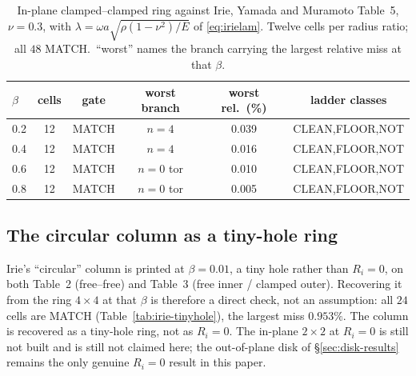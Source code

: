\documentclass[11pt]{article}
\begin{document}
\begin{table}[htbp]\centering\small
\caption{In-plane clamped--clamped ring against Irie, Yamada and Muramoto Table~5, $\nu=0.3$, with $\lambda=\omega a\sqrt{\rho(1-\nu^{2})/E}$ of \eqref{eq:irielam}. Twelve cells per radius ratio; all $48$ MATCH.\ ``worst'' names the branch carrying the largest relative miss at that $\beta$.}
\label{tab:irie-t5}
\begin{tabular}{lccccc}
\toprule
$\beta$ & cells & gate & worst branch & worst rel.\ (\%) & ladder classes\\
\midrule
0.2 & 12 & MATCH & $n=4$ & 0.039 & CLEAN,FLOOR,NOT \\
0.4 & 12 & MATCH & $n=4$ & 0.016 & CLEAN,FLOOR,NOT \\
0.6 & 12 & MATCH & $n=0$ tor & 0.010 & CLEAN,FLOOR,NOT \\
0.8 & 12 & MATCH & $n=0$ tor & 0.005 & CLEAN,FLOOR,NOT \\
\bottomrule
\end{tabular}
\end{table}

\subsection{The circular column as a tiny-hole ring}\label{sec:ip-tinyhole}
Irie's ``circular'' column is printed at $\beta=0.01$, a tiny hole rather
than $R_i=0$, on both Table~2 (free--free) and Table~3 (free inner / clamped
outer). Recovering it from the ring $4\times4$ at that $\beta$ is therefore a
direct check, not an assumption: all $24$ cells are MATCH
(Table~\ref{tab:irie-tinyhole}), the largest miss $0.953\%$. The column is
recovered as a tiny-hole ring, not as $R_i=0$. The
in-plane $2\times2$ at $R_i=0$ is still not built and is still not claimed
here; the out-of-plane disk of \S\ref{sec:disk-results} remains the only
genuine $R_i=0$ result in this paper.
\end{document}
